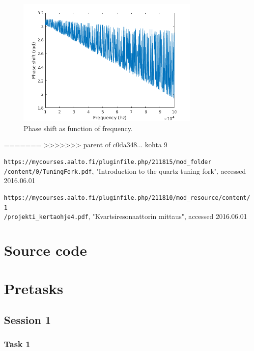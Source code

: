 \documentclass[12pt]{article}
\begin{document}
\begin{figure}[!ht]
\centering
\includegraphics[width = 0.8\textwidth]{kuvat/f-ps.png}
\caption{Phase shift as function of frequency.}
\label{fig:f-ps}
\end{figure}

=======
>>>>>>> parent of c0da348... kohta 9
\begin{thebibliography}{1}
 \texttt{https://mycourses.aalto.fi/pluginfile.php/211815/mod\_folder\\/content/0/TuningFork.pdf}, "Introduction to the quartz tuning fork", accessed 2016.06.01

 \texttt{https://mycourses.aalto.fi/pluginfile.php/211810/mod\_resource/content/1\\/projekti\_kertaohje4.pdf}, "Kvartsiresonaattorin mittaus", accessed 2016.06.01
\end{thebibliography}

\appendix

\section{Source code}


%

\section{Pretasks}

\subsection{Session 1}

\subsubsection{Task 1}
\end{document}
